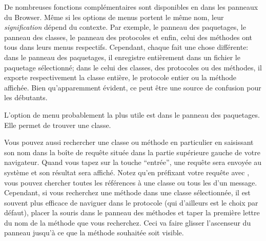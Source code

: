 \documentclass[a4paper,10pt,twoside]{book}
\begin{document}
De nombreuses fonctions complémentaires sont disponibles 
en \actclickant{} dans les panneaux du Browser.
Même si les options de menus portent le même nom,
leur \emph{signification} dépend du contexte.
Par exemple, le panneau des paquetages, le
panneau des classes, le panneau des protocoles et enfin, celui des méthodes
ont tous  dans leurs menus respectifs. Cependant, chaque 
 fait une chose différente: dans le panneau des paquetages,
il enregistre entièrement dans un fichier le paquetage
sélectionné; dans le celui des classes, des protocoles ou des
méthodes, il exporte respectivement la classe entière, le protocole
entier ou la méthode affichée. %
Bien qu'apparemment évident, ce peut être une source de confusion pour
les débutants. 

L'option de menu probablement la plus utile est  
dans le panneau des paquetages. 
Elle permet de trouver une classe.

Vous pouvez aussi rechercher une classe ou méthode en particulier en
saisissant son nom dans la boîte de requête située dans la partie 
supérieure gauche de votre navigateur. Quand vous tapez
sur la touche ``entrée'', une requête sera envoyée au système et son
résultat sera affiché. %
Notez qu'en préfixant votre requête avec \ct{#}, vous pouvez chercher
toutes les références à une classe ou tous les \senders d'un
message.
Cependant, si vous recherchez une méthode dans une classe sélectionnée, il est
souvent plus efficace de naviguer dans le protocole  
(qui d'ailleurs est le choix par défaut), placer la souris dans le
panneau des méthodes et taper la première lettre du nom de la méthode
que vous recherchez. %
Ceci va faire glisser l'ascenseur du panneau jusqu'à ce que la méthode souhaitée soit visible.
\end{document}
